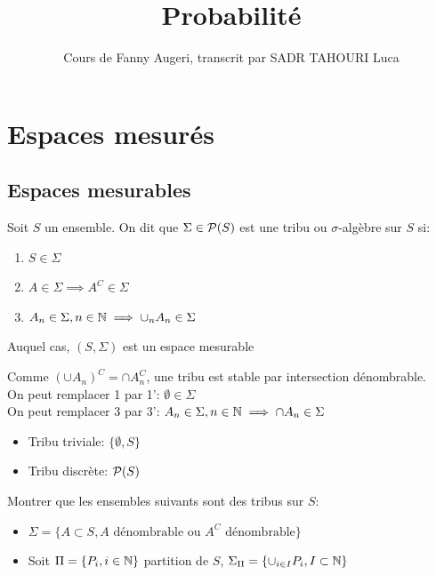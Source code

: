 \documentclass[]{report}
\title{Probabilité}
\author{Cours de Fanny Augeri, transcrit par SADR TAHOURI Luca}
\date{}
\begin{document}
    \maketitle
    \tableofcontents

    \chapter{Espaces mesurés}

    \section{Espaces mesurables}

    \begin{df}{}{}
        Soit $S$ un ensemble. On dit que $\Sigma\in \mathcal{P}(S)$ est une tribu ou $\sigma$-algèbre sur $S$ si:
        \begin{enumerate}
            \item $S\in\Sigma$
            \item $A\in\Sigma \implies A^C\in \Sigma$
            \item $A_n\in\Sigma,n\in\mathbb{N}\implies \cup_n A_n\in \Sigma$
        \end{enumerate}
        Auquel cas, $(S,\Sigma)$ est un espace mesurable
    \end{df}

    \begin{re}{}{}
        Comme ${(\cup A_n)}^C=\cap A_n^C$, une tribu est stable par intersection dénombrable.\\
        On peut remplacer 1 par 1': $\emptyset\in\Sigma$\\
        On peut remplacer 3 par 3': $A_n\in\Sigma,n\in\mathbb{N}\implies \cap A_n\in\Sigma$
    \end{re}

    \begin{ex}{}{}
        \begin{itemize}
            \item Tribu triviale: $\{\emptyset,S\}$
            \item Tribu discrète: $\mathcal{P}(S)$
        \end{itemize}
    \end{ex}

    \begin{exo}{}{}
        Montrer que les ensembles suivants sont des tribus sur $S$:
        \begin{itemize}
            \item $\Sigma=\{A\subset S,\text{$A$ dénombrable ou $A^C$ dénombrable}\}$
            \item Soit $\Pi=\{P_i,i\in\mathbb{N}\}$ partition de $S$, $\Sigma_\Pi=\{\cup_{i\in I} P_i,I\subset \mathbb{N}\}$
        \end{itemize}
    \end{exo}
\end{document}
